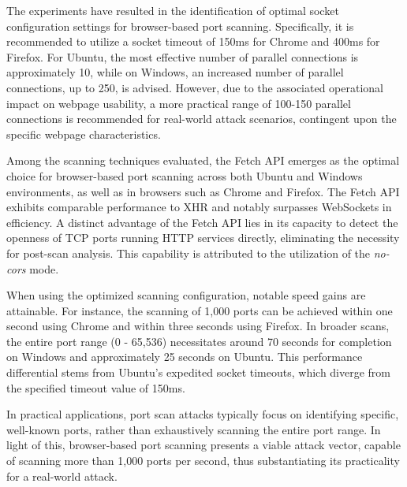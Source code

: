 The experiments have resulted in the identification of optimal socket configuration settings for browser-based port scanning. Specifically, it is recommended to utilize a socket timeout of 150ms for Chrome and 400ms for Firefox. For Ubuntu, the most effective number of parallel connections is approximately 10, while on Windows, an increased number of parallel connections, up to 250, is advised. However, due to the associated operational impact on webpage usability, a more practical range of 100-150 parallel connections is recommended for real-world attack scenarios, contingent upon the specific webpage characteristics. 

Among the scanning techniques evaluated, the Fetch API emerges as the optimal choice for browser-based port scanning across both Ubuntu and Windows environments, as well as in browsers such as Chrome and Firefox. The Fetch API exhibits comparable performance to XHR and notably surpasses WebSockets in efficiency. A distinct advantage of the Fetch API lies in its capacity to detect the openness of TCP ports running HTTP services directly, eliminating the necessity for post-scan analysis. This capability is attributed to the utilization of the \emph{no-cors} mode.

When using the optimized scanning configuration, notable speed gains are attainable. For instance, the scanning of 1,000 ports can be achieved within one second using Chrome and within three seconds using Firefox. In broader scans, the entire port range (0 - 65,536) necessitates around 70 seconds for completion on Windows and approximately 25 seconds on Ubuntu. This performance differential stems from Ubuntu's expedited socket timeouts, which diverge from the specified timeout value of 150ms.

In practical applications, port scan attacks typically focus on identifying specific, well-known ports, rather than exhaustively scanning the entire port range. In light of this, browser-based port scanning presents a viable attack vector, capable of scanning more than 1,000 ports per second, thus substantiating its practicality for a real-world attack.






